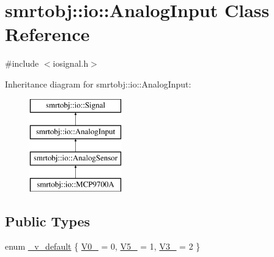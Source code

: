 \hypertarget{classsmrtobj_1_1io_1_1_analog_input}{}\section{smrtobj\+:\+:io\+:\+:Analog\+Input Class Reference}
\label{classsmrtobj_1_1io_1_1_analog_input}


{\ttfamily \#include $<$iosignal.\+h$>$}

Inheritance diagram for smrtobj\+:\+:io\+:\+:Analog\+Input\+:\begin{figure}[H]
\begin{center}
\leavevmode
\includegraphics[height=4.000000cm]{classsmrtobj_1_1io_1_1_analog_input}
\end{center}
\end{figure}
\subsection*{Public Types}
\begin{DoxyCompactItemize}
\item 
enum \hyperlink{classsmrtobj_1_1io_1_1_analog_input_a4e2bf85b374d5856fc0dee0225fbd025}{\+\_\+v\+\_\+default} \{ \hyperlink{classsmrtobj_1_1io_1_1_analog_input_a4e2bf85b374d5856fc0dee0225fbd025a61b0cbe28d17a05cb3a268398c370cb9}{V0\+\_} = 0, 
\hyperlink{classsmrtobj_1_1io_1_1_analog_input_a4e2bf85b374d5856fc0dee0225fbd025a2692641238f0ae5eb558d1f9c1688604}{V5\+\_} = 1, 
\hyperlink{classsmrtobj_1_1io_1_1_analog_input_a4e2bf85b374d5856fc0dee0225fbd025aac4c61fd6d37aacbf3bd6a3be6d835d3}{V3\+\_} = 2
 \}
\end{DoxyCompactItemize}
